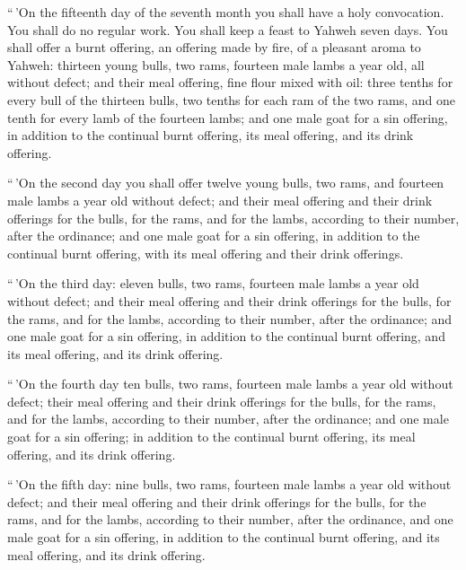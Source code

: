  ``\,'On the fifteenth day of the seventh month you shall
have a holy convocation. You shall do no regular work. You shall keep a
feast to Yahweh seven days.  You shall offer a burnt
offering, an offering made by fire, of a pleasant aroma to Yahweh:
thirteen young bulls, two rams, fourteen male lambs a year old, all
without defect;  and their meal offering, fine flour
mixed with oil: three tenths for every bull of the thirteen bulls, two
tenths for each ram of the two rams,  and one tenth for
every lamb of the fourteen lambs;  and one male goat for
a sin offering, in addition to the continual burnt offering, its meal
offering, and its drink offering.

 ``\,'On the second day you shall offer twelve young
bulls, two rams, and fourteen male lambs a year old without defect;
 and their meal offering and their drink offerings for
the bulls, for the rams, and for the lambs, according to their number,
after the ordinance;  and one male goat for a sin
offering, in addition to the continual burnt offering, with its meal
offering and their drink offerings.

 ``\,'On the third day: eleven bulls, two rams, fourteen
male lambs a year old without defect;  and their meal
offering and their drink offerings for the bulls, for the rams, and for
the lambs, according to their number, after the ordinance;
 and one male goat for a sin offering, in addition to the
continual burnt offering, and its meal offering, and its drink offering.

 ``\,'On the fourth day ten bulls, two rams, fourteen
male lambs a year old without defect;  their meal
offering and their drink offerings for the bulls, for the rams, and for
the lambs, according to their number, after the ordinance;
 and one male goat for a sin offering; in addition to the
continual burnt offering, its meal offering, and its drink offering.

 ``\,'On the fifth day: nine bulls, two rams, fourteen
male lambs a year old without defect;  and their meal
offering and their drink offerings for the bulls, for the rams, and for
the lambs, according to their number, after the ordinance,
 and one male goat for a sin offering, in addition to the
continual burnt offering, and its meal offering, and its drink offering.

